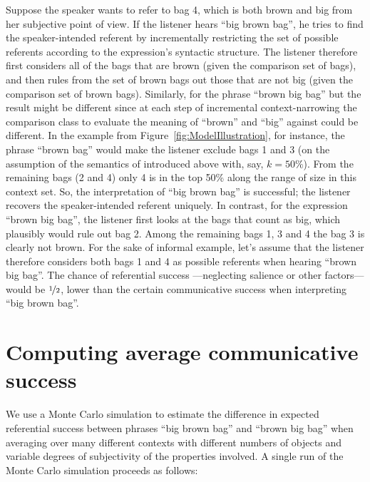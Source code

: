 \documentclass[10pt,a4paper]{article}
\begin{document}
Suppose the speaker wants to refer to bag 4, which is both brown and big from her subjective point of view. If the listener hears ``big brown bag'', he tries to find the speaker-intended referent by incrementally restricting the set of possible referents according to the expression's syntactic structure. The listener therefore first considers all of the bags that are brown (given the comparison set of bags), and then rules from the set of brown bags out those that are not big (given the comparison set of brown bags). Similarly, for the phrase ``brown big bag'' but the result might be different since at each step of incremental context-narrowing the comparison class to evaluate the meaning of ``brown'' and ``big'' against could be different. In the example from Figure~\ref{fig:ModelIllustration}, for instance, the phrase ``brown bag'' would make the listener exclude bags 1 and 3 (on the assumption of the semantics of  introduced above with, say, $k = 50\%$). From the remaining bags (2 and 4) only 4 is in the top 50\% along the range of size in this context set. So, the interpretation of ``big brown bag'' is successful; the listener recovers the speaker-intended referent uniquely. In contrast, for the expression ``brown big bag'', the listener first looks at the bags that count as big, which plausibly would rule out bag 2. Among the remaining bags 1, 3 and 4 the bag 3 is clearly not brown. For the sake of informal example, let's assume that the listener therefore considers both bags 1 and 4 as possible referents when hearing ``brown big bag''. The chance of referential success ---neglecting salience or other factors--- would be $\nicefrac{1}{2}$, lower than the certain communicative success when interpreting ``big brown bag''.


\section{Computing average communicative success}

We use a Monte Carlo simulation to estimate the difference in expected referential success between phrases ``big brown bag'' and ``brown big bag'' when averaging over many different contexts with different numbers of objects and variable degrees of subjectivity of the properties involved. A single run of the Monte Carlo simulation proceeds as follows:
\end{document}
